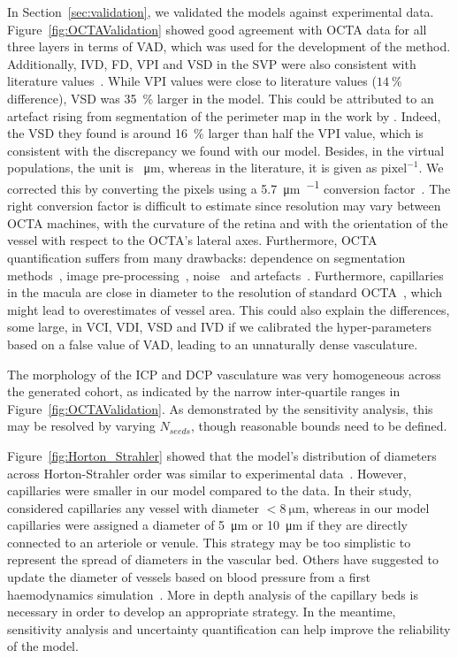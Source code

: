 \documentclass[11pt,]{article}
\begin{document}
In Section~\ref{sec:validation}, we validated the models against experimental data.
Figure~\ref{fig:OCTAValidation} showed good agreement with OCTA data for all three layers in terms of VAD, which was used for the development of the method.
Additionally, IVD, FD, VPI and VSD in the SVP were also consistent with literature values~\cite{Chu2016,Ma2021,Liu_2021}.
While VPI values were close to literature values ($\SI{14}{\percent}$ difference), VSD was \SI{35}{\percent} larger in the model.
This could be attributed to an artefact rising from segmentation of the perimeter map in the work by \citet{Chu2016}.
Indeed, the VSD they found is around \SI{16}{\percent} larger than half the VPI value, which is consistent with the discrepancy we found with our model.
Besides, in the virtual populations, the unit is \SI{}{\micro\metre}, whereas in the literature, it is given as $\text{pixel}^{-1}$.
We corrected this by converting the pixels using a \SI{5.7}{\micro\metre\per{}} conversion factor~\cite{Spectralis}.
The right conversion factor is difficult to estimate since resolution may vary between OCTA machines, with the curvature of the retina and with the orientation of the vessel with respect to the OCTA's lateral axes. Furthermore, OCTA quantification suffers from many drawbacks: dependence on segmentation methods~\cite{Mehta_2020}, image pre-processing~\cite{Mehta_2019}, noise~\cite{Szpernal2023} and artefacts~\cite{Yao_2020}.
Furthermore, capillaries in the macula are close in diameter to the resolution of standard OCTA~\cite{Chu2016}, which might lead to overestimates of vessel area.
This could also explain the differences, some large, in VCI, VDI, VSD and IVD if we calibrated the hyper-parameters based on a false value of VAD, leading to an unnaturally dense vasculature.

The morphology of the ICP and DCP vasculature was very homogeneous across the generated cohort, as indicated by the narrow inter-quartile ranges in Figure~\ref{fig:OCTAValidation}.
As demonstrated by the sensitivity analysis, this may be resolved by varying $N_{seeds}$, though reasonable bounds need to be defined.

Figure~\ref{fig:Horton_Strahler} showed that the model's distribution of diameters across Horton-Strahler order was similar to experimental data~\cite{An2020}.
However, capillaries were smaller in our model compared to the data.
In their study, \citet{An2020} considered capillaries any vessel with diameter $<\SI{8}{\micro\metre}$, whereas in our model capillaries were assigned a diameter of \SI{5}{\micro\metre} or \SI{10}{\micro\metre} if they are directly connected to an arteriole or venule.
This strategy may be too simplistic to represent the spread of diameters in the vascular bed.
Others have suggested to update the diameter of vessels based on blood pressure from a first haemodynamics simulation~\cite{Linninger2013}.
More in depth analysis of the capillary beds is necessary in order to develop an appropriate strategy.
In the meantime, sensitivity analysis and uncertainty quantification can help improve the reliability of the model.
\end{document}
